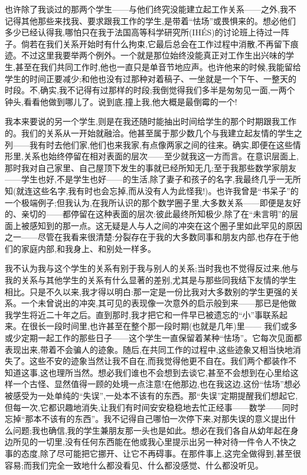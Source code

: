 也许除了我谈过的那两个学生——与他们终究没能建立起工作关系——之外,我不记得其他那些来找我、要求跟我工作的学生,是带着“怯场”或畏惧来的。想必他们多少已经认得我,哪怕只在我于法国高等科学研究所(IHÉS)的讨论班上待过一阵子。倘若在我们关系开始时有什么拘束,它最后总会在工作过程中消散,不再留下痕迹。不过这里我要举两个例外。一个就是那位始终没能真正对工作生出兴味的学生,甚至在我们共同工作时,他也一直只是单音节地应声。也许他来的时候,我能留给学生的时间正要减少;和他也没有过那种对着稿子、一坐就是一个下午、一整天的时段。不,确实,我不记得有过那样的时段;我倒觉得我们多半是匆匆见一面,一两个钟头,看看他做到哪儿了。说到底,撞上我,他大概是最倒霉的一个!

我本来要说的另一个学生,则是在我还随时能抽出时间给学生的那个时期跟我工作的。我们的关系从一开始就融洽。他甚至属于那少数几个与我建立起友情的学生之列——我有时去他们家,他们也来我家,有点像两家之间的往来。确实,即便在这些情形里,关系也始终停留在相对表面的层次——至少就我这一方而言。在意识层面上,那时我对自己家里、自己屋顶下发生的事就已经所知无几;至于我那些数学家朋友——学生也好,不是学生也好——的生活,除了妻子和孩子的名字,我最终几乎一无所知(就连这些名字,我有时也会忘掉,而从没有人为此怪我!)。也许我曾是“书呆子”的一个极端例子;但我认为,在我所认识的那个数学圈子里,大多数关系——即便是友好的、亲切的——都停留在这种表面的层次:彼此最终所知极少,除了在“未言明”的层面上被感知到的那一点。这无疑是人与人之间的冲突在这个圈子里如此罕见的原因之一——尽管在我看来很清楚:分裂存在于我的大多数同事和朋友内部,也存在于他们的家庭内部,和我身上、和别处一样多。

我不认为我与这个学生的关系有别于我与别人的关系;当时我也不觉得反过来,他与我的关系与其他学生的关系有什么显著的差别,尤其是与那些同我结下友情的学生相比。只是不久以来,我才得以明白:那一定是一份比我对大多数别的学生更强的关系。一个未曾说出的冲突,其可见的表现像一次意外的启示般到来——那已是他做我学生将近二十年之后。直到那时,我才把它和一件早已被遗忘的“小”事联系起来。在很长一段时间里,也许甚至在整个那一段时期(也就是几年)里——%
我们或多或少定期一起工作的那些日子——这个学生一直保留着某种“怯场”。它每次见面都表现出来,带着不会骗人的迹象。随后,在共同工作的过程中,这些迹象又相当快地消失了。这些不安的迹象当然让我不自在,而我觉得他更不自在。我们两个都装作不知道这事,这也理所当然。想必我们谁也不会想到去谈它,甚至不会想到在心里给这样一个古怪、显然值得一顾的处境一点注意!在他那边,也在我这边,这份“怯场”想必被感受为一处单纯的“失误”,一处本不该有的东西。那“失误”定期提醒我们想起它,但每一次,它都识趣地消失,让我们有时间安安稳稳地去忙正经事——数学——同时忘掉“那本不该有的东西”。我不记得自己哪怕一次停下来,对那失误的意义提出什么问题;我也确信,我的学生兼朋友那一头也是如此。想必在我们各自从幼年起在身边所见的一切里,没有任何东西能在他或我心里提示出另一种对待一件令人不快之事的态度,除了尽可能把它挪开、让它不再碍事。在那件事上,这完全做得到,甚至很容易;而我们完全一致地什么都没看见、什么都没感觉、什么都没听见。

